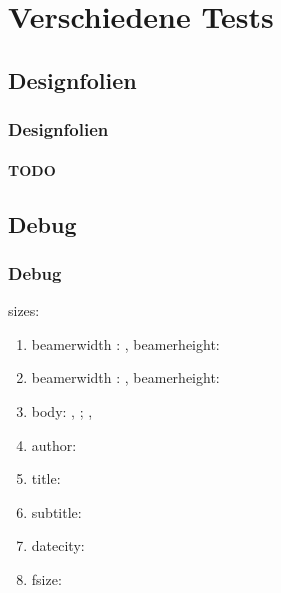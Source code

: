 \documentclass[german,notoc]{tudbeamer}%
\begin{document}
\section{Verschiedene Tests}	
\subsection{Designfolien}

\begin{frame}
	\frametitle{Designfolien}
	\framesubtitle{TODO}
\end{frame}


\subsection{Debug}
\makeatletter
\begin{frame}[allowframebreaks]
	\frametitle{Debug}
	sizes:
	\begin{enumerate}
		\item beamerwidth : \the\paperwidth, beamerheight: \the\paperheight
		\item beamerwidth : \number\paperwidth, beamerheight:\number\paperheight
		\item body: \the\bodyx, \the\bodyy; \the\bodywidth, \the\bodywidth
		\item author: \insertauthor
		\item title: \inserttitle
		\item subtitle: \insertsubtitle
		\item datecity: \insertdatecity
		\item fsize: \f@size
	\end{enumerate}
\end{frame}
\makeatother

%
%

\disableSectionFrame%
\end{document}

